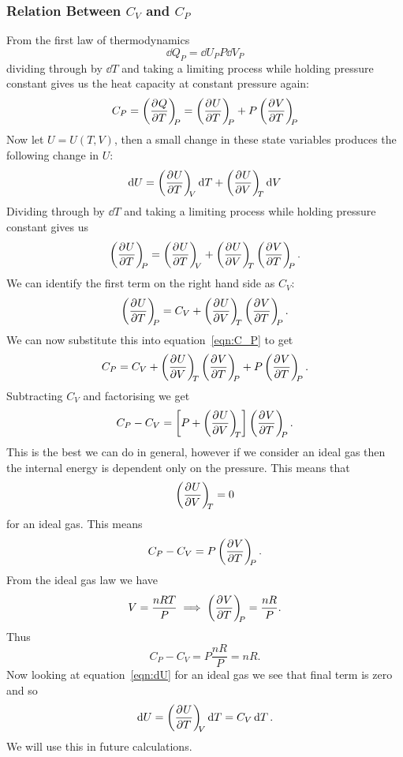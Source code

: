 \documentclass[a4paper]{article}
\begin{document}
    \subsubsection{Relation Between \texorpdfstring{\(C_V\)}{CV} and \texorpdfstring{\(C_P\)}{CP}}
    From the first law of thermodynamics
    \[\dd{Q_P} = \dd{U_P} P\dd{V_P}\]
    dividing through by \(\dd{T}\) and taking a limiting process while holding pressure constant gives us the heat capacity at constant pressure again:
    \begin{equation}\label{eqn:C_P}
        C_P = \left(\pdv[]{Q}{T}\right)_{\!\!{P}} = \left(\pdv[]{U}{T}\right)_{\!\!{P}} + P\left(\pdv[]{V}{T}\right)_{\!\!{P}}
    \end{equation}
    Now let \(U = U(T, V)\), then a small change in these state variables produces the following change in \(U\):
    \begin{equation}\label{eqn:dU}
        \dd{U} = \left(\pdv[]{U}{T}\right)_{\!\!{V}}\dd{T} + \left(\pdv[]{U}{V}\right)_{\!\!{T}}\dd{V}
    \end{equation}
    Dividing through by \(\dd{T}\) and taking a limiting process while holding pressure constant gives us
    \[\pdvconst{U}{T}{P} = \pdvconst{U}{T}{V} + \pdvconst{U}{V}{T}\pdvconst{V}{T}{P}.\]
    We can identify the first term on the right hand side as \(C_V\):
    \[\left(\pdv[]{U}{T}\right)_{\!\!{P}} = C_V + \left(\pdv[]{U}{V}\right)_{\!\!{T}}\left(\pdv[]{V}{T}\right)_{\!\!{P}}.\]
    We can now substitute this into equation~\ref{eqn:C_P} to get
    \[C_P = C_V + \left(\pdv[]{U}{V}\right)_{\!\!{T}}\left(\pdv[]{V}{T}\right)_{\!\!{P}} + P\left(\pdv[]{V}{T}\right)_{\!\!{P}}.\]
    Subtracting \(C_V\) and factorising we get
    \[C_P - C_V = \left[P + \left(\pdv[]{U}{V}\right)_{\!\!{T}}\right]\left(\pdv[]{V}{T}\right)_{\!\!{P}}.\]
    This is the best we can do in general, however if we consider an ideal gas then the internal energy is dependent only on the pressure.
    This means that
    \[\left(\pdv[]{U}{V}\right)_{\!\!{T}} = 0\]
    for an ideal gas.
    This means
    \[C_P - C_V = P\left(\pdv[]{V}{T}\right)_{\!\!{P}}.\]
    From the ideal gas law we have
    \[V = \frac{nRT}{P} \implies \left(\pdv[]{V}{T}\right)_{\!\!{P}} = \frac{nR}{P}.\]
    Thus
    \begin{equation}\label{eqn:C_P - C_V = nR ideal gas}
        C_P - C_V = P\frac{nR}{P} = nR.
    \end{equation}
    Now looking at equation~\ref{eqn:dU} for an ideal gas we see that final term is zero and so
    \begin{equation}\label{eqn:dU = C_VdT ideal gas}
        \dd{U} = \left(\pdv[]{U}{T}\right)_{\!\!{V}}\dd{T} = C_V\dd{T}.
   \end{equation} 
    We will use this in future calculations.
    
\end{document}
